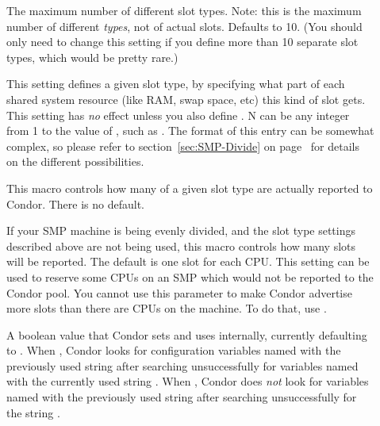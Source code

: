 \begin{description}

\item[]
\label{param:MaxSlotTypes}
  The maximum number of different slot types.  
  Note: this is the maximum number of different \emph{types}, not of
  actual slots.
  Defaults to 10.  
  (You should only need to change this setting if you define more than
  10 separate slot types, which would be pretty rare.)

\item[]
\label{param:SlotTypeN}
  This setting defines a given slot type, by specifying
  what part of each shared system resource (like RAM, swap space, etc)
  this kind of slot gets.  This setting has \emph{no} effect unless you also
  define .
  N can be any integer from 1 to the value of
  , such as
  . 
  The format of this entry can be somewhat complex, so please refer to
  section~\ref{sec:SMP-Divide} on page~\pageref{sec:SMP-Divide} for
  details on the different possibilities.

\item[]
\label{param:NumSlotsTypeN}
  This macro controls how many of a given slot type
  are actually reported to Condor.
  There is no default.

\item[]
\label{param:NumSlots}
  If your SMP machine is being evenly divided, and the slot
  type settings described above are not being used, this
  macro controls how many slots will be reported.  
  The default is one slot for each CPU.
  This setting can be used to reserve some CPUs on an SMP which would
  not be reported to the Condor pool. You cannot use this parameter to
  make Condor advertise more slots than there are CPUs on the machine.
  To do that, use .

\item[]
\label{param:AllowVMCruft}
  A boolean value that Condor sets and uses internally, currently
  defaulting to .  When ,
  Condor looks for configuration variables named with the
  previously used string  after searching unsuccessfully
  for variables named with the currently used string .
  When , Condor does \emph{not} look for variables named
  with the previously used string  after searching
  unsuccessfully for the string . 

\end{description}

